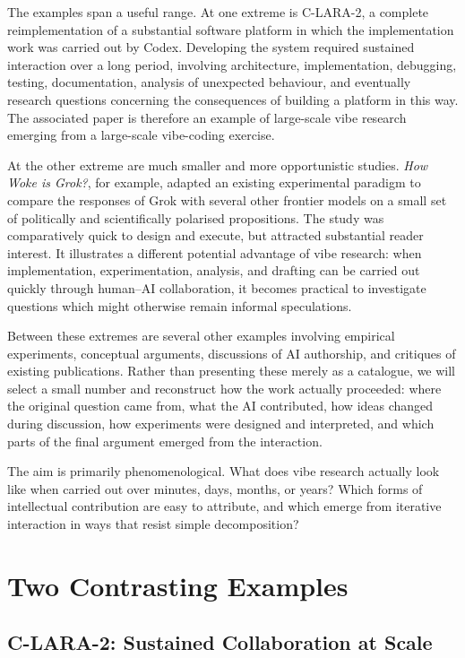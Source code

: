 The examples span a useful range. At one extreme is C-LARA-2, a complete reimplementation of a substantial software platform in which the implementation work was carried out by Codex. Developing the system required sustained interaction over a long period, involving architecture, implementation, debugging, testing, documentation, analysis of unexpected behaviour, and eventually research questions concerning the consequences of building a platform in this way. The associated paper is therefore an example of large-scale vibe research emerging from a large-scale vibe-coding exercise.

At the other extreme are much smaller and more opportunistic studies. \emph{How Woke is Grok?}, for example, adapted an existing experimental paradigm to compare the responses of Grok with several other frontier models on a small set of politically and scientifically polarised propositions. The study was comparatively quick to design and execute, but attracted substantial reader interest. It illustrates a different potential advantage of vibe research: when implementation, experimentation, analysis, and drafting can be carried out quickly through human--AI collaboration, it becomes practical to investigate questions which might otherwise remain informal speculations.

Between these extremes are several other examples involving empirical experiments, conceptual arguments, discussions of AI authorship, and critiques of existing publications. Rather than presenting these merely as a catalogue, we will select a small number and reconstruct how the work actually proceeded: where the original question came from, what the AI contributed, how ideas changed during discussion, how experiments were designed and interpreted, and which parts of the final argument emerged from the interaction.

The aim is primarily phenomenological. What does vibe research actually look like when carried out over minutes, days, months, or years? Which forms of intellectual contribution are easy to attribute, and which emerge from iterative interaction in ways that resist simple decomposition?


\section{Two Contrasting Examples}

\subsection{C-LARA-2: Sustained Collaboration at Scale}

